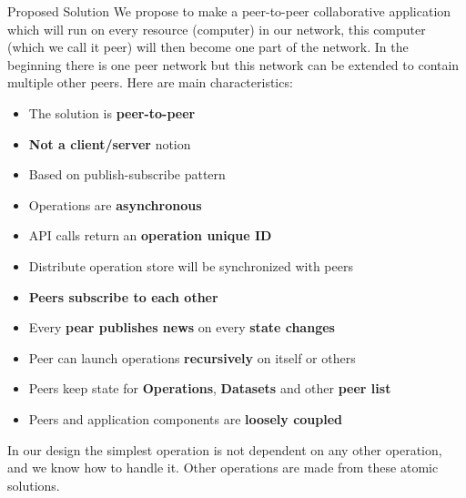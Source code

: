 \documentclass[final,hyperref={pdfpagelabels=true}]{beamer}
\begin{document}
\begin{frame}
\begin{columns}[t]
\begin{column}{.45\textwidth}
\begin{block}{Proposed Solution}
      We propose to make a peer-to-peer collaborative application which will run on every resource (computer) in our network, this computer (which we call it peer) will then become one part of the network. In the beginning there is one peer network but this network can be extended to contain multiple other peers. Here are main characteristics:
      \begin{itemize}
      \item The solution is \textbf{peer-to-peer}
      \item \textbf{Not a client/server} notion
      \item Based on publish-subscribe pattern
      \item Operations are \textbf{asynchronous}
      \item API calls return an \textbf{operation unique ID}
      \item Distribute operation store will be synchronized with peers
      \item \textbf{Peers subscribe to each other}
      \item Every \textbf{pear publishes news} on every \textbf{state changes}
      \item Peer can launch operations \textbf{recursively} on itself or others
      \item Peers keep state for \textbf{Operations}, \textbf{Datasets} and other \textbf{peer list}
      \item Peers and application components are \textbf{loosely coupled}
      \end{itemize}
      
      In our design the simplest operation is not dependent on any other operation, and we know how to handle it. Other operations are made from these atomic solutions.
      
      \end{block}


\end{column}
\end{columns}
\end{frame}
\end{document}
